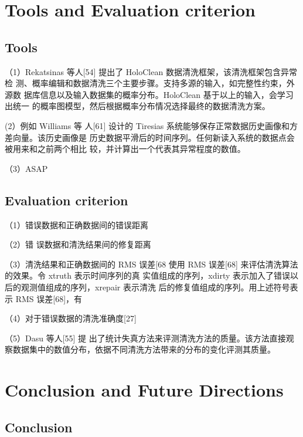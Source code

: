 \documentclass{article}
\begin{document}
\section{Tools and Evaluation criterion}

\subsection{Tools}
（1）Rekatsinas 等人[54] 提出了 HoloClean 数据清洗框架，该清洗框架包含异常检 测、概率编辑和数据清洗三个主要步骤。支持多源的输入，如完整性约束，外源数 据库信息以及输入数据集的概率分布。HoloClean 基于以上的输入，会学习出统一 的概率图模型，然后根据概率分布情况选择最终的数据清洗方案。 
\par (2）例如 Williams 等 人[61] 设计的 Tiresias 系统能够保存正常数据历史画像和方差向量。该历史画像是 历史数据平滑后的时间序列。任何新读入系统的数据点会被用来和之前两个相比 较，并计算出一个代表其异常程度的数值。
\par（3）ASAP

\subsection{Evaluation criterion}
\par（1）错误数据和正确数据间的错误距离 
\par （2）错 误数据和清洗结果间的修复距离 
\par（3）清洗结果和正确数据间的 RMS 误差[68
使用 RMS 误差[68] 来评估清洗算法的效果。令 xtruth 表示时间序列的真 实值组成的序列，xdirty 表示加入了错误以后的观测值组成的序列，xrepair 表示清洗 后的修复值组成的序列。用上述符号表示 RMS 误差[68]，有 
\par （4）对于错误数据的清洗准确度[27]
\par（5）Dasu 等人[55] 提 出了统计失真方法来评测清洗方法的质量。该方法直接观察数据集中的数值分布，依据不同清洗方法带来的分布的变化评测其质量。

\section{Conclusion and Future Directions}

\subsection{Conclusion}
\end{document}
